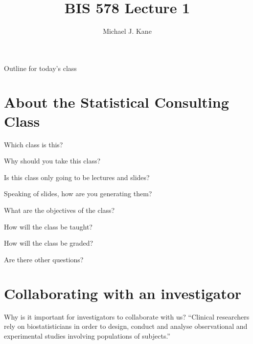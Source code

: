 \documentclass[13pt]{beamer}
\title{BIS 578 Lecture 1}
\author{Michael J. Kane}
\date{}
\begin{document}
\begin{frame}
  \titlepage
\end{frame}

\begin{frame}{Outline for today's class}
  \tableofcontents
\end{frame}

\section{About the Statistical Consulting Class}

\begin{frame}{Which class is this?}
\end{frame}

\begin{frame}{Why should you take this class?}
\end{frame}

\begin{frame}{Is this class only going to be lectures and slides?}
\end{frame}

\begin{frame}{Speaking of slides, how are you generating them?}
\end{frame}

\begin{frame}{What are the objectives of the class?}
\end{frame}

\begin{frame}{How will the class be taught?}
\end{frame}

\begin{frame}{How will the class be graded?}
\end{frame}

\begin{frame}
Are there other questions?
\end{frame}

\section{Collaborating with an investigator}

\begin{frame}{Why is it important for investigators to collaborate with us?}
``Clinical researchers rely on biostatisticians in order to design, conduct and 
analyse observational and experimental studies involving populations of 
subjects.'' \citep{Bangdiwala2001}
\end{frame}
\end{document}
